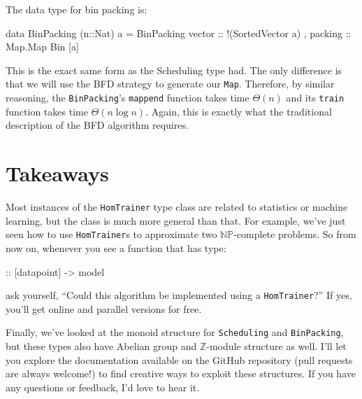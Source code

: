 \documentclass[tikz]{tmr}
\newcommand\h{\lstinline}
\newcommand{\np}{{\ensuremath{\mathbb{NP}}}}
\newcommand\+{\mdoubleplus}
\begin{document}
\begin{figure}[H]
\begin{tikzpicture}
\end{tikzpicture}
\vspace{0.05in}
\end{figure}

The data type for bin packing is:
\begin{spec}
data BinPacking (n::Nat) a = BinPacking
    { vector  :: !(SortedVector a)
    , packing :: Map.Map Bin [a]
    }
\end{spec}
This is the exact same form as the Scheduling type had.
The only difference is that we will use the BFD strategy to generate our \h{Map}.
Therefore, by similar reasoning, the \h{BinPacking}'s \h{mappend} function takes time $\Theta(n)$ and its \h{train} function takes time $\Theta(n\log n)$.
Again, this is exactly what the traditional description of the BFD algorithm requires.

\section{Takeaways}

Most instances of the \h{HomTrainer} type class are related to statistics or machine learning, but the class is much more general than that.
For example, we've just seen how to use \h{HomTrainer}s to approximate two \np-complete problems.
So from now on, whenever you see a function that has type:
\begin{spec}
 :: [datapoint] -> model
\end{spec}
ask yourself, ``Could this algorithm be implemented using a \h{HomTrainer}?''
If yes, you'll get online and parallel versions for free.

Finally, we've looked at the monoid structure for \h{Scheduling} and \h{BinPacking}, but these types also have Abelian group and $\mathbb{Z}$-module structure as well.
I'll let you explore the documentation available on the GitHub repository \cite{hlearn} 
(pull requests are always welcome!)
to find creative ways to exploit these structures.
If you have any questions or feedback, I'd love to hear it.

% 

\end{document}
